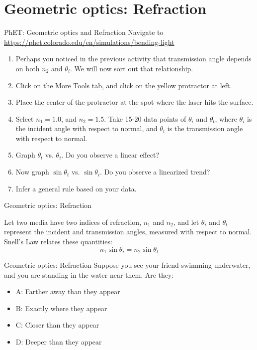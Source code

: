 \documentclass{beamer}
\begin{document}
\section{Geometric optics: Refraction}

\begin{frame}[fragile]{PhET: Geometric optics and Refraction}
\footnotesize
Navigate to \url{https://phet.colorado.edu/en/simulations/bending-light} \\
\begin{enumerate}
\item Perhaps you noticed in the previous activity that transmission angle depends on both $n_2$ and $\theta_i$.  We will now sort out that relationship.
\item Click on the More Tools tab, and click on the yellow protractor at left.
\item Place the center of the protractor at the spot where the laser hits the surface.
\item Select $n_1 = 1.0$, and $n_2 = 1.5$.  Take 15-20 data points of $\theta_i$ and $\theta_t$, where $\theta_i$ is the incident angle with respect to normal, and $\theta_t$ is the transmission angle with respect to normal.
\item Graph $\theta_t$ vs. $\theta_i$.  Do you observe a linear effect?
\item Now graph $\sin\theta_t$ vs. $\sin\theta_i$.  Do you observe a linearized trend?
\item Infer a general rule based on your data.
\end{enumerate}
\end{frame}

\begin{frame}[fragile]{Geometric optics: Refraction}
\begin{tcolorbox}[colback=white,colframe=black!40!black,title=Snell's Law]
\alert{Let two media have two indices of refraction, $n_1$ and $n_2$, and let $\theta_i$ and $\theta_t$ represent the incident and transmission angles, measured with respect to normal.  Snell's Law relates these quantities:
\begin{equation}
n_1 \sin\theta_i = n_2\sin\theta_t
\end{equation}
}
\end{tcolorbox}
\end{frame}

\begin{frame}[fragile]{Geometric optics: Refraction}
Suppose you see your friend swimming underwater, and you are standing in the water near them.  Are they:
\begin{itemize}
\item A: Farther away than they appear
\item B: Exactly where they appear
\item C: Closer than they appear
\item D: Deeper than they appear
\end{itemize}
\end{frame}
\end{document}
